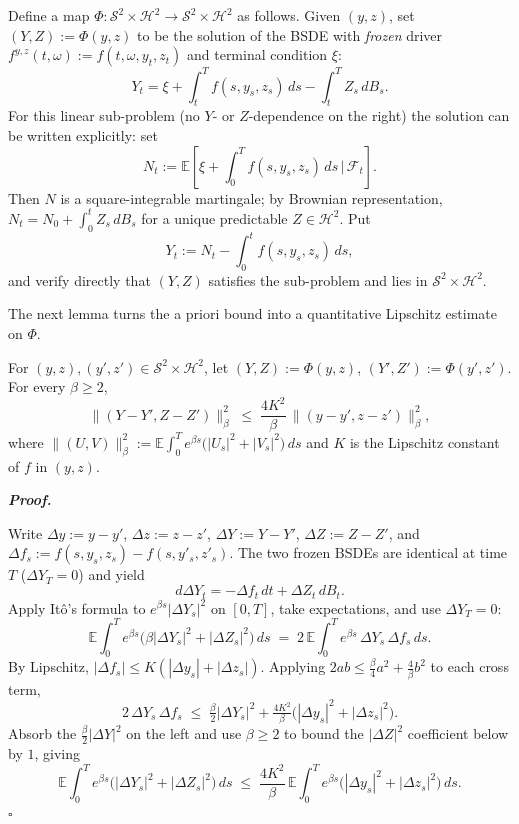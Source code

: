 \documentclass{article}
\newenvironment{proof}[1][Proof]{%
  \par\smallskip\noindent\textit{\textbf{#1.}}\quad\ignorespaces
}{%
  \hfill$\square$\par\smallskip
}
\newcommand{\E}{\mathbb{E}}
\newcommand{\F}{\mathcal{F}}
\newcommand{\Sc}{\mathcal{S}}
\newcommand{\Hc}{\mathcal{H}}
\begin{document}
Define a map $\Phi : \Sc^2 \times \Hc^2 \to \Sc^2 \times \Hc^2$ as follows. Given $(y, z)$, set $(Y, Z) := \Phi(y, z)$ to be the solution of the BSDE with \emph{frozen} driver $f^{y,z}(t, \omega) := f(t, \omega, y_t, z_t)$ and terminal condition $\xi$:
\[
  Y_t = \xi + \int_t^T f(s, y_s, z_s)\,ds - \int_t^T Z_s\, dB_s.
\]
For this linear sub-problem (no $Y$- or $Z$-dependence on the right) the solution can be written explicitly: set
\[
  N_t := \E\!\left[\xi + \int_0^T f(s, y_s, z_s)\,ds \,\bigg|\, \F_t\right].
\]
Then $N$ is a square-integrable martingale; by Brownian representation, $N_t = N_0 + \int_0^t Z_s\, dB_s$ for a unique predictable $Z \in \Hc^2$. Put
\[
  Y_t := N_t - \int_0^t f(s, y_s, z_s)\,ds,
\]
and verify directly that $(Y, Z)$ satisfies the sub-problem and lies in $\Sc^2 \times \Hc^2$.

The next lemma turns the a priori bound into a quantitative Lipschitz estimate on $\Phi$.

\begin{lemma}\label{lem:diff}
For $(y, z), (y', z') \in \Sc^2 \times \Hc^2$, let $(Y, Z) := \Phi(y, z)$, $(Y', Z') := \Phi(y', z')$. For every $\beta \ge 2$,
\[
  \|(Y - Y', Z - Z')\|_\beta^2 \;\le\; \frac{4K^2}{\beta}\, \|(y - y', z - z')\|_\beta^2,
\]
where $\|(U, V)\|_\beta^2 := \E\!\int_0^T e^{\beta s}\big(|U_s|^2 + |V_s|^2\big)\,ds$ and $K$ is the Lipschitz constant of $f$ in $(y, z)$.
\end{lemma}

\begin{proof}
Write $\Delta y := y - y'$, $\Delta z := z - z'$, $\Delta Y := Y - Y'$, $\Delta Z := Z - Z'$, and $\Delta f_s := f(s, y_s, z_s) - f(s, y'_s, z'_s)$. The two frozen BSDEs are identical at time $T$ ($\Delta Y_T = 0$) and yield
\[
  d\Delta Y_t = -\Delta f_t\, dt + \Delta Z_t\, dB_t.
\]
Apply It\^o's formula to $e^{\beta s} |\Delta Y_s|^2$ on $[0, T]$, take expectations, and use $\Delta Y_T = 0$:
\[
  \E\!\int_0^T e^{\beta s}\!\big(\beta |\Delta Y_s|^2 + |\Delta Z_s|^2\big)\, ds \;=\; 2\,\E\!\int_0^T e^{\beta s}\, \Delta Y_s\, \Delta f_s\, ds.
\]
By Lipschitz, $|\Delta f_s| \le K(|\Delta y_s| + |\Delta z_s|)$. Applying $2ab \le \tfrac{\beta}{4}a^2 + \tfrac{4}{\beta} b^2$ to each cross term,
\[
  2\, \Delta Y_s\, \Delta f_s \;\le\; \tfrac{\beta}{2}|\Delta Y_s|^2 + \tfrac{4 K^2}{\beta}\!\big(|\Delta y_s|^2 + |\Delta z_s|^2\big).
\]
Absorb the $\tfrac{\beta}{2}|\Delta Y|^2$ on the left and use $\beta \ge 2$ to bound the $|\Delta Z|^2$ coefficient below by $1$, giving
\[
  \E\!\int_0^T e^{\beta s}\big(|\Delta Y_s|^2 + |\Delta Z_s|^2\big)\, ds \;\le\; \frac{4K^2}{\beta}\, \E\!\int_0^T e^{\beta s}\big(|\Delta y_s|^2 + |\Delta z_s|^2\big)\, ds.
\]
\end{proof}
\end{document}

